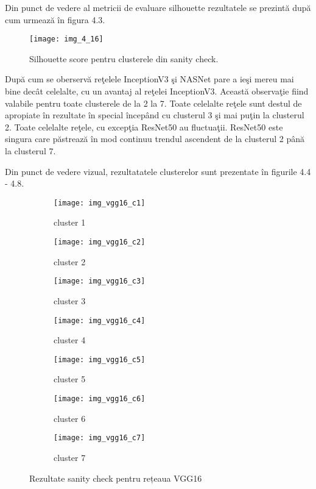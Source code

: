 Din punct de vedere al metricii de evaluare silhouette rezultatele se prezintă după cum urmează în figura 4.3.
\begin{figure}[!h]
	\centering
	\texttt{[image: img\_4\_16]}
	\caption[Silhouette score pentru clusterele din sanity check]{Silhouette score pentru clusterele din sanity check.}
\end{figure} 
După cum se oberservă reţelele InceptionV3 şi NASNet pare a ieşi
mereu mai bine decât celelalte, cu un avantaj al reţelei InceptionV3. Această observaţie
fiind valabile pentru toate clusterele de la 2 la 7. Toate celelalte reţele sunt destul de
apropiate în rezultate în special începând cu clusterul 3 şi mai puţin la clusterul 2. Toate
celelalte reţele, cu excepţia ResNet50 au fluctuaţii. ResNet50 este singura care păstrează
în mod continuu trendul ascendent de la clusterul 2 până la clusterul 7.

Din punct de vedere vizual, rezultatatele clusterelor sunt prezentate în figurile 4.4 - 4.8.
\begin{figure}[!h]
  \centering
  \begin{subfigure}[t]{0.45\textwidth}
    \caption{cluster 1}
    \texttt{[image: img\_vgg16\_c1]}
  \end{subfigure}
  \hfill
  \begin{subfigure}[t]{0.45\textwidth}
    \caption{cluster 2}
    \texttt{[image: img\_vgg16\_c2]}
  \end{subfigure}
   \hfill
  \begin{subfigure}[t]{0.45\textwidth}
    \caption{cluster 3}
    \texttt{[image: img\_vgg16\_c3]}
  \end{subfigure}
  \hfill
  \begin{subfigure}[t]{0.45\textwidth}
    \caption{cluster 4}
    \texttt{[image: img\_vgg16\_c4]}
  \end{subfigure}
  \hfill
  \begin{subfigure}[t]{0.45\textwidth}
    \caption{cluster 5}
    \texttt{[image: img\_vgg16\_c5]}
  \end{subfigure}
  \hfill
  \begin{subfigure}[t]{0.45\textwidth}
    \caption{cluster 6}
    \texttt{[image: img\_vgg16\_c6]}
  \end{subfigure}
    \hfill
  \begin{subfigure}[t]{0.45\textwidth}
    \caption{cluster 7}
    \texttt{[image: img\_vgg16\_c7]}
  \end{subfigure}
  \caption[Rezultate sanity check pentru rețeaua VGG16]{Rezultate sanity check pentru rețeaua VGG16}
\end{figure}

